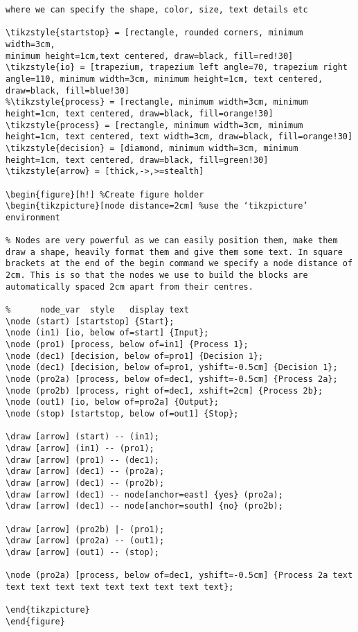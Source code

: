 \documentclass[12pt, right open]{memoir}
\begin{document}
\begin{lstlisting}[style=codeTex]
% Create Tikz style, something like typedef in C, 
where we can specify the shape, color, size, text details etc

\tikzstyle{startstop} = [rectangle, rounded corners, minimum width=3cm, 
minimum height=1cm,text centered, draw=black, fill=red!30]
\tikzstyle{io} = [trapezium, trapezium left angle=70, trapezium right angle=110, minimum width=3cm, minimum height=1cm, text centered, draw=black, fill=blue!30]
%\tikzstyle{process} = [rectangle, minimum width=3cm, minimum height=1cm, text centered, draw=black, fill=orange!30]
\tikzstyle{process} = [rectangle, minimum width=3cm, minimum height=1cm, text centered, text width=3cm, draw=black, fill=orange!30]
\tikzstyle{decision} = [diamond, minimum width=3cm, minimum height=1cm, text centered, draw=black, fill=green!30]
\tikzstyle{arrow} = [thick,->,>=stealth]

\begin{figure}[h!] %Create figure holder
\begin{tikzpicture}[node distance=2cm] %use the ‘tikzpicture’ environment

% Nodes are very powerful as we can easily position them, make them draw a shape, heavily format them and give them some text. In square brackets at the end of the begin command we specify a node distance of 2cm. This is so that the nodes we use to build the blocks are automatically spaced 2cm apart from their centres.

%      node_var  style   display text
\node (start) [startstop] {Start};
\node (in1) [io, below of=start] {Input};
\node (pro1) [process, below of=in1] {Process 1};
\node (dec1) [decision, below of=pro1] {Decision 1};
\node (dec1) [decision, below of=pro1, yshift=-0.5cm] {Decision 1};
\node (pro2a) [process, below of=dec1, yshift=-0.5cm] {Process 2a};
\node (pro2b) [process, right of=dec1, xshift=2cm] {Process 2b};
\node (out1) [io, below of=pro2a] {Output};
\node (stop) [startstop, below of=out1] {Stop};

\draw [arrow] (start) -- (in1);
\draw [arrow] (in1) -- (pro1);
\draw [arrow] (pro1) -- (dec1);
\draw [arrow] (dec1) -- (pro2a);
\draw [arrow] (dec1) -- (pro2b);
\draw [arrow] (dec1) -- node[anchor=east] {yes} (pro2a);
\draw [arrow] (dec1) -- node[anchor=south] {no} (pro2b);

\draw [arrow] (pro2b) |- (pro1);
\draw [arrow] (pro2a) -- (out1);
\draw [arrow] (out1) -- (stop);

\node (pro2a) [process, below of=dec1, yshift=-0.5cm] {Process 2a text text text text text text text text text text};

\end{tikzpicture}
\end{figure}
\end{lstlisting}
%
\end{document}
